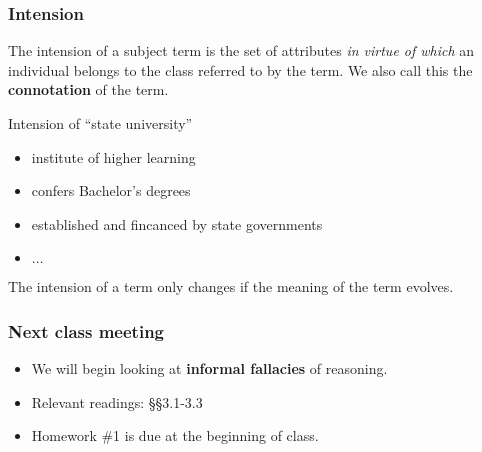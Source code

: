 \documentclass[10pt,letterpaper,xcolor=dvipsnames,handout]{beamer}
\begin{document}
\begin{frame}
  \frametitle{Intension}
  
  The intension of a subject term is the set of attributes \textit{in virtue of which} an individual belongs to the class referred to by the term. We also call this the \textbf{connotation} of the term.
  
  \begin{block}{Intension of ``state university''}
    \begin{itemize}
      \item institute of higher learning
      \item confers Bachelor's degrees
      \item established and fincanced by state governments
      \item $\ldots$
    \end{itemize}
  \end{block}
  
  The intension of a term only changes if the meaning of the term evolves.
  
\end{frame}

\begin{frame}
  \frametitle{Next class meeting}
  
  \begin{itemize}
    \item We will begin looking at \textbf{informal fallacies} of reasoning.
    \item Relevant readings: \S\S 3.1-3.3
    \item Homework \#1 is due at the beginning of class.
  \end{itemize}
  
\end{frame}
\end{document}
